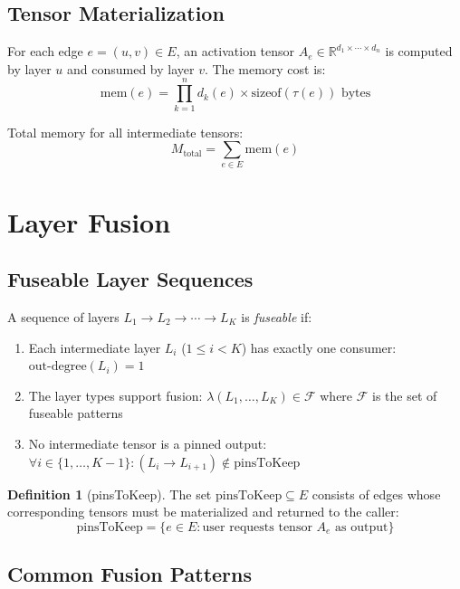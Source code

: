 \documentclass[12pt]{article}
\theoremstyle{definition}
\newtheorem{definition}{Definition}
\begin{document}
\subsection{Tensor Materialization}

For each edge $e = (u, v) \in E$, an activation tensor $A_e \in \mathbb{R}^{d_1 \times \cdots \times d_n}$ is computed by layer $u$ and consumed by layer $v$. The memory cost is:
\begin{equation}
\text{mem}(e) = \prod_{k=1}^{n} d_k(e) \times \text{sizeof}(\tau(e)) \text{ bytes}
\end{equation}

Total memory for all intermediate tensors:
\begin{equation}
M_{\text{total}} = \sum_{e \in E} \text{mem}(e)
\end{equation}

\section{Layer Fusion}

\subsection{Fuseable Layer Sequences}

A sequence of layers $L_1 \to L_2 \to \cdots \to L_K$ is \emph{fuseable} if:
\begin{enumerate}
  \item Each intermediate layer $L_i$ ($1 \leq i < K$) has exactly one consumer: $\text{out-degree}(L_i) = 1$
  \item The layer types support fusion: $\lambda(L_1, \ldots, L_K) \in \mathcal{F}$ where $\mathcal{F}$ is the set of fuseable patterns
  \item No intermediate tensor is a pinned output: $\forall i \in \{1, \ldots, K-1\} : (L_i \to L_{i+1}) \notin \text{pinsToKeep}$
\end{enumerate}

\begin{definition}[pinsToKeep]
The set $\text{pinsToKeep} \subseteq E$ consists of edges whose corresponding tensors must be materialized and returned to the caller:
\begin{equation}
\text{pinsToKeep} = \{e \in E : \text{user requests tensor } A_e \text{ as output}\}
\end{equation}
\end{definition}

\subsection{Common Fusion Patterns}
\end{document}
